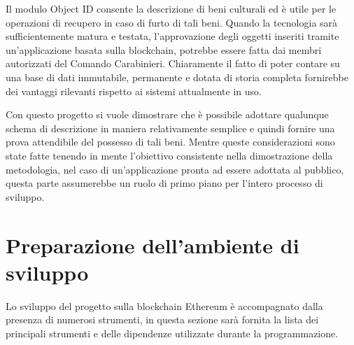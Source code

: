 Il modulo Object ID consente la descrizione di beni culturali ed è utile per le operazioni di recupero in caso di furto di tali beni. Quando la tecnologia sarà sufficientemente matura e testata, l'approvazione degli oggetti inseriti tramite un'applicazione basata sulla blockchain, potrebbe essere fatta dai membri autorizzati del Comando Carabinieri. Chiaramente il fatto di poter contare su una base di dati immutabile, permanente e dotata di storia completa fornirebbe dei vantaggi rilevanti rispetto ai sistemi attualmente in uso.

Con questo progetto si vuole dimostrare che è possibile adottare qualunque schema di descrizione in maniera relativamente semplice e quindi fornire una prova attendibile del possesso di tali beni. Mentre queste considerazioni sono state fatte tenendo in mente l'obiettivo consistente nella dimostrazione della metodologia, nel caso di un’applicazione pronta ad essere adottata al pubblico, questa parte assumerebbe un ruolo di primo piano per l'intero processo di sviluppo.

\section{Preparazione dell'ambiente di sviluppo}

Lo sviluppo del progetto sulla blockchain Ethereum è accompagnato dalla presenza di numerosi strumenti, in questa sezione sarà fornita la lista dei principali strumenti e delle dipendenze utilizzate durante la programmazione.

